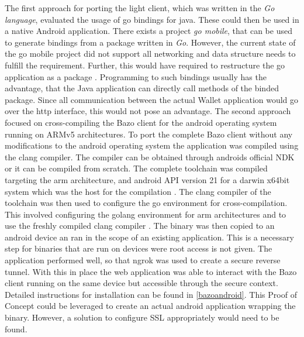 The first approach for porting the light client, which was written in the \textit{Go language}, evaluated the usage of go bindings for java. These could then be used in a native Android application. There exists a project \textit{go mobile}, that can be used to generate bindings from a package written in \textit{Go}. However, the current state of the go mobile project did not support all networking and data structure needs to fulfill the requirement. Further, this would have required to restructure the go application as a package \cite{gobind}. Programming to such bindings usually has the advantage, that the Java application can directly call methods of the binded package. Since all communication between the actual Wallet application would go over the http interface, this would not pose an advantage.
The second approach focused on cross-compiling the Bazo client for the android operating system running on ARMv5 architectures.
To port the complete Bazo client without any modifications to the android operating system the application was compiled using the clang compiler. The compiler can be obtained through androids official NDK or it can be compiled from scratch. The complete toolchain was compiled targeting the arm architecture, and android API version 21 for a darwin x64bit system which was the host for the compilation \cite{standalonetoolchain}. The clang compiler of the toolchain was then used to configure the go environment for cross-compilation. This involved configuring the golang environment for arm architectures and to use the freshly compiled clang compiler \cite{gobuild}.
The binary was then copied to an android device an ran in the scope of an existing application. This is a necessary step for binaries that are run on devices were root access is not given. The application performed well, so that ngrok was used to create a secure reverse tunnel. With this in place the web application was able to interact with the Bazo client running on the same device but accessible through the secure context. Detailed instructions for installation can be found in \ref{bazoandroid}.
This Proof of Concept could be leveraged to create an actual android application wrapping the binary. However, a solution to configure SSL appropriately would need to be found.

